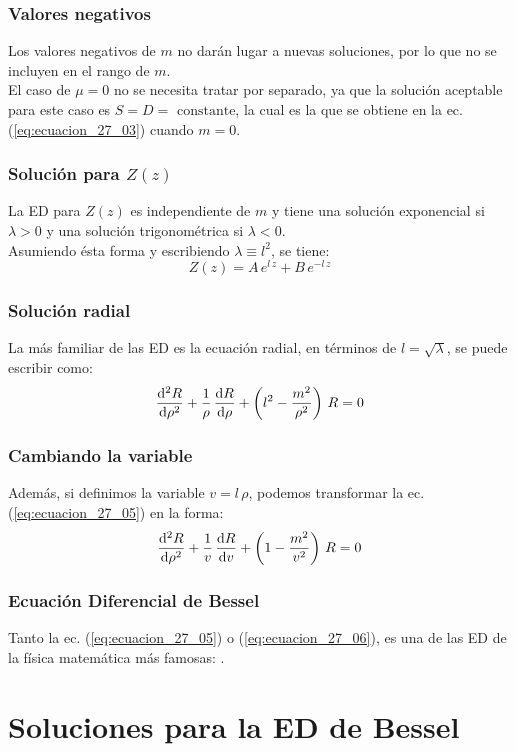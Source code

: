 \documentclass[12pt]{beamer}
\begin{document}
\begin{frame}
\frametitle{Valores negativos}
Los valores negativos de $m$ no darán lugar a nuevas soluciones, por lo que no se incluyen en el rango de $m$.
\\
\bigskip
El caso de $\mu = 0$ no se necesita tratar por separado, \pause ya que la solución aceptable para este caso es $S = D = \mbox{ constante}$, la cual es la que se obtiene en la ec. (\ref{eq:ecuacion_27_03}) cuando $m = 0$.
\end{frame}
\begin{frame}
\frametitle{Solución para $Z (z)$}
La ED para $Z (z)$ es independiente de $m$ \pause y tiene una solución exponencial si $\lambda > 0$ y una solución trigonométrica si $\lambda < 0$.
\\
\bigskip
\pause
Asumiendo ésta forma y escribiendo $\lambda \equiv l^{2}$, se tiene:
\pause
\begin{equation}
Z (z) = A \, e^{l \, z} + B \, e^{- l \, z}
\label{eq:ecuacion_27_04}
\end{equation}
\end{frame}
\begin{frame}
\frametitle{Solución radial}
La más familiar de las ED es la ecuación radial, \pause en términos de $l = \sqrt{\lambda}$, se puede escribir como:
\pause
\begin{equation}
\dv[2]{R}{\rho} + \dfrac{1}{\rho} \, \dv{R}{\rho} + \left( l^{2} - \dfrac{m^{2}}{\rho^{2}} \right) \, R = 0
\label{eq:ecuacion_27_05}
\end{equation}
\end{frame}
\begin{frame}
\frametitle{Cambiando la variable}
Además, si definimos la variable $v = l\, \rho$, podemos transformar la ec. (\ref{eq:ecuacion_27_05}) en la forma:
\pause
\begin{equation}
\dv[2]{R}{\rho} + \dfrac{1}{v} \, \dv{R}{v} + \left( 1 - \dfrac{m^{2}}{v^{2}} \right) \, R = 0
\label{eq:ecuacion_27_06}
\end{equation}
\end{frame}
\begin{frame}
\frametitle{Ecuación Diferencial de Bessel}
Tanto la ec. (\ref{eq:ecuacion_27_05}) o (\ref{eq:ecuacion_27_06}), es una de las ED de la física matemática más famosas: .
\end{frame}

\section{Soluciones para la ED de Bessel}
\end{document}
